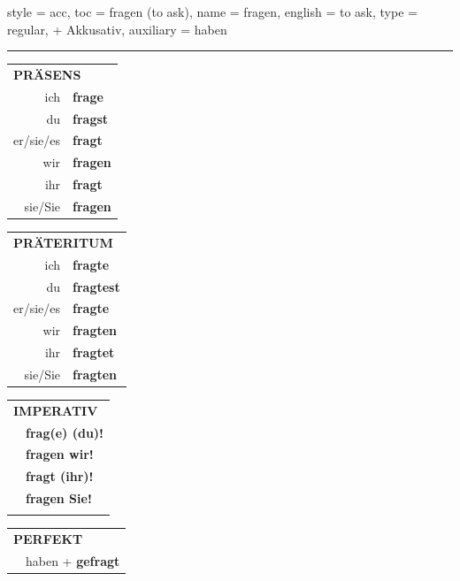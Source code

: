 \begin{verbentry}{
  style = {acc},
  toc = {fragen (to ask)},
  name = {fragen},
  english = {to ask},
  type = {regular, + Akkusativ},
  auxiliary = {haben}
}
 
    
     \vspace{5pt}

    \hrule
    
    \vspace{5pt}

  \begin{tabular}{rl}
     \multicolumn{2}{l}{\textbf{PRÄSENS} }\\
    ich & \textbf{frage}\\
    du & \textbf{fragst}\\
    er/sie/es & \textbf{fragt}\\
    wir & \textbf{fragen}\\
    ihr & \textbf{fragt}\\
    sie/Sie & \textbf{fragen}\\
  \end{tabular}
  \hfill
     \begin{tabular}{rl}
    \multicolumn{2}{l}{\textbf{PRÄTERITUM} }\\
    ich & \textbf{fragte}\\
    du & \textbf{fragtest}\\
    er/sie/es & \textbf{fragte}\\
    wir & \textbf{fragten}\\
    ihr & \textbf{fragtet}\\
    sie/Sie & \textbf{fragten}\\
  \end{tabular}
  \hfill
  \begin{tabular}{rl}
     \multicolumn{2}{l}{\textbf{IMPERATIV} }\\
   & \textbf{frag(e) (du)!}\\
   & \textbf{fragen wir!}\\
   & \textbf{fragt (ihr)!}\\
   & \textbf{fragen Sie!}\\
   & \vspace{10pt}
  \end{tabular}

    \vspace{10pt}

 \begin{tabular}{rl}
     \multicolumn{2}{l}{\textbf{PERFEKT}}\\
   & haben + \textbf{gefragt}\\
  \end{tabular}
\hfill
   \begin{tabular}{rl}
   

\end{tabular}
\end{verbentry}
